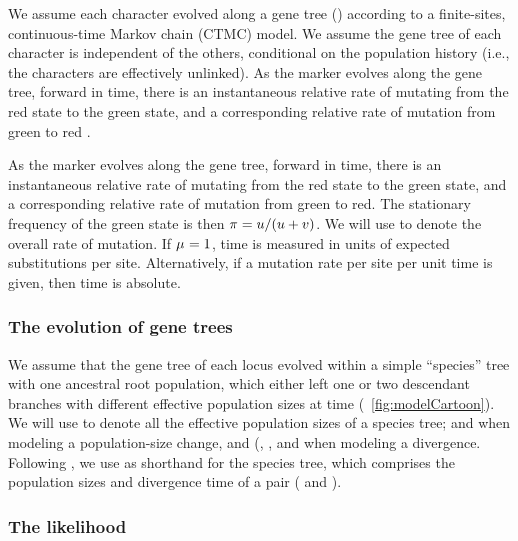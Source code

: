 We assume each character evolved along a gene tree (\genetree)
according to a finite-sites, continuous-time Markov chain (CTMC) model.
We assume the gene tree of each character is independent of the others,
conditional on the population history (i.e., the characters are effectively
unlinked).
As the marker evolves along the gene tree, forward in time, there is an
instantaneous relative rate \rgmurate of mutating from the red state to the
green state, and a corresponding relative rate \grmurate of mutation from
green to red \citep{Bryant2012,Oaks2018ecoevolity}.

As the marker evolves along the gene tree, forward in time, there is an
instantaneous relative rate \rgmurate of mutating from the red state to the
green state, and a corresponding relative rate \grmurate of mutation from green
to red.
The stationary frequency of the green state is then
$\pi_{} = u / (u + v)$.
We will use \murate to denote the overall rate of mutation.
If $\mu_{} = 1$, time is measured in
units of expected substitutions per site.
Alternatively, if a mutation rate per site per unit time is given, then time is
absolute.

\subsubsection{The evolution of gene trees}

We assume that the gene tree of each locus evolved within a simple
``species'' tree with one ancestral root population, which either
left one or two descendant branches with different effective population sizes
at time \comparisonetime
(\fig{}~\ref{fig:modelCartoon}).
We will use
\comparisonpopsizes{}
to denote all the effective population sizes of a species tree;
\epopsize[\rootpopindex] and 
\epopsize[\descendantpopindex{1}] when modeling a population-size change, and
(\epopsize[\rootpopindex],
\epopsize[\descendantpopindex{1}],
and \epopsize[\descendantpopindex{2}] when modeling a divergence.
Following \citet{Oaks2018ecoevolity}, we use
\sptree{}
as shorthand for the species tree, which comprises the population sizes and
divergence time of a pair
(\comparisonpopsizes{} and \comparisonetime{}).


\subsubsection{The likelihood}

